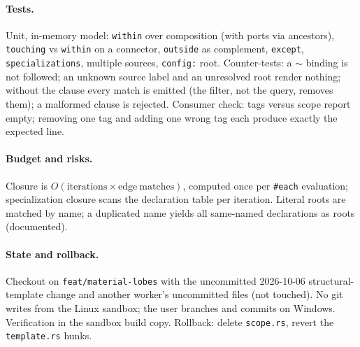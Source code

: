 \documentclass[11pt,a4paper]{article}
\begin{document}
\paragraph{Tests.} Unit, in-memory model: \texttt{within} over composition (with ports via
ancestors), \texttt{touching} vs \texttt{within} on a connector, \texttt{outside} as complement,
\texttt{except}, \texttt{specializations}, multiple sources, \texttt{config:} root.
Counter-tests: a $\sim$ binding is not followed; an unknown source label and an unresolved
root render nothing; without the clause every match is emitted (the filter, not the query,
removes them); a malformed clause is rejected. Consumer check: tags versus scope report empty;
removing one tag and adding one wrong tag each produce exactly the expected line.
\paragraph{Budget and risks.} Closure is $O(\mathrm{iterations}\times\mathrm{edge\ matches})$,
computed once per \texttt{\#each} evaluation; specialization closure scans the declaration
table per iteration. Literal roots are matched by name; a duplicated name yields all
same-named declarations as roots (documented).
\paragraph{State and rollback.} Checkout on \texttt{feat/material-lobes} with the uncommitted
2026-10-06 structural-template change and another worker's uncommitted files (not touched).
No git writes from the Linux sandbox; the user branches and commits on Windows. Verification
in the sandbox build copy. Rollback: delete \texttt{scope.rs}, revert the \texttt{template.rs} hunks.
\begin{center}\end{center}
\end{document}
